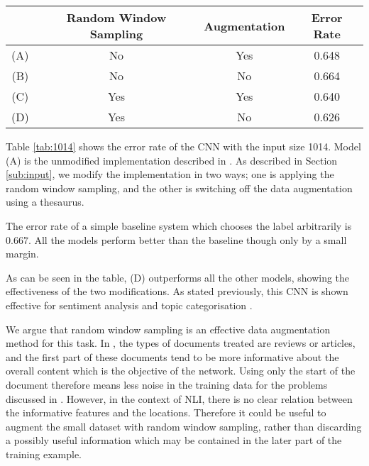
\begin{table*}[]
\centering
\caption{Error Rate of Models with Input Size 1014}
\label{tab:1014}
\begin{tabular}{cccc}
& Random Window Sampling & Augmentation  & Error Rate \\ \hline
(A)& No                     & Yes                & 0.648      \\
(B)& No                     & No                 &0.664     \\
(C)& Yes                     & Yes                &  0.640    \\
(D)& Yes                    & No                 & 0.626
\end{tabular}
\end{table*}
Table \ref{tab:1014} shows the error rate of the CNN with the input size 1014.
Model (A) is the unmodified implementation described in \citep{zhang2015character}.
As described in Section \ref{sub:input}, we modify the implementation in two ways; one is applying the random window sampling, and the other is switching off the data augmentation using a thesaurus.

The error rate of a simple baseline system which chooses the label arbitrarily is $0.667$. 
All the models perform better than the baseline though only by a small margin.

As can be seen in the table, (D) outperforms all the other models, showing the effectiveness of the two modifications.
As stated previously, this CNN is shown effective for sentiment analysis and topic categorisation \citep{zhang2015character}.

We argue that random window sampling is an effective data augmentation method for this task.
In \citep{zhang2015character}, the types of documents treated are reviews or articles, and the first part of these documents tend to be more informative about the overall content which is the objective of the network.
Using only the start of the document therefore means less noise in the training data for the problems discussed in \citep{zhang2015character}.
However, in the context of NLI, there is no clear relation between the informative features and the locations.
Therefore it could be useful to augment the small dataset with random window sampling, rather than discarding a possibly useful information which may be contained in the later part of the training example.

